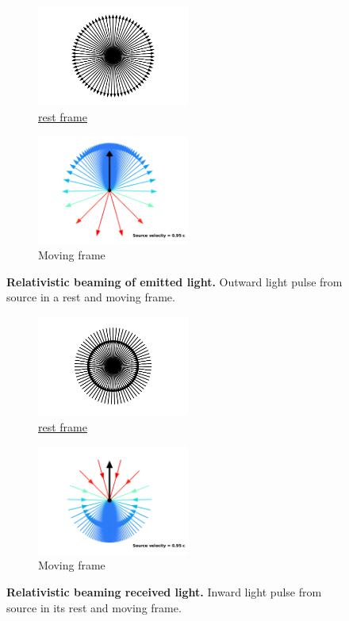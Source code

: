 \begin{figure}[H]
	\begin{subfigure}{.49\textwidth}
		\centering
		\includegraphics[width = 5cm]{images/pdf/Rest_velocities.pdf}
		\caption{\hyperlink{def-proper-frame}{rest frame}}
	\end{subfigure}
	\begin{subfigure}{.49\textwidth}
		\centering
		\includegraphics[width = 5cm]{images/pdf/Aberrated_velocities.pdf}
		\caption{Moving frame}
	\end{subfigure}
	\caption{\textbf{Relativistic beaming of emitted light.} Outward light pulse from source in a rest and moving frame.}
	\label{fig: Relativistic Beaming}
\end{figure}

\begin{figure}[H]
	\begin{subfigure}{.49\textwidth}
		\centering
		\includegraphics[width = 5cm]{images/pdf/Rest_velocities_inwards.pdf}
		\caption{\hyperlink{def-proper-frame}{rest frame}}
	\end{subfigure}
	\begin{subfigure}{.49\textwidth}
		\centering
		\includegraphics[width = 5cm]{images/pdf/Aberrated_velocities_inwards.pdf}
		\caption{Moving frame}
	\end{subfigure}
	\caption{\textbf{Relativistic beaming received light.} Inward light pulse from source in its rest and moving frame.}
	\label{fig: Relativistic Beaming Recieved}
\end{figure}

